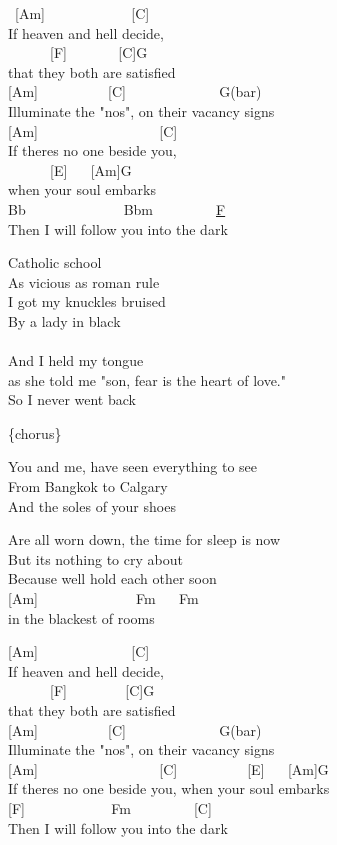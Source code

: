 \documentclass[
  letterpaper,
]{scrbook}
\begin{document}
~{[}Am{]} ~ ~ ~ ~ ~ ~ ~ {[}C{]} ~ ~\\
If heaven and hell decide, ~ ~ ~\\
\hspace*{0.333em} ~ ~ ~ ~{[}F{]} ~ ~ ~ ~ {[}C{]}G\\
that they both are satisfied\\
{[}Am{]} ~ ~ ~ ~ ~ ~{[}C{]} ~ ~ ~ ~ ~ ~ ~ ~G(bar)\\
Illuminate the "no\textquotesingle s", on their vacancy signs\\
{[}Am{]} ~ ~ ~ ~ ~ ~ ~ ~ ~ ~ {[}C{]}\\
If there\textquotesingle s no one beside you,\\
\hspace*{0.333em} ~ ~ ~ ~{[}E{]} ~ ~{[}Am{]}G\\
when your soul embarks\\
Bb ~ ~ ~ ~ ~ ~ ~ ~ Bbm ~ ~ ~ ~ ~ \href{C\%20root\%20note}{F}\\
Then I will follow you into the dark

Catholic school\\
As vicious as roman rule\\
I got my knuckles bruised\\
By a lady in black\\
\hspace*{0.333em} ~\\
And I held my tongue\\
as she told me "son, fear is the heart of love."\\
So I never went back

\{chorus\}

You and me, have seen everything to see\\
From Bangkok to Calgary ~\\
And the soles of your shoes

Are all worn down, the time for sleep is now\\
But it\textquotesingle s nothing to cry about ~\\
Because we\textquotesingle ll hold each other soon\\
{[}Am{]} ~ ~ ~ ~ ~ ~ ~ ~ Fm ~ ~Fm\\
in the blackest of rooms

{[}Am{]} ~ ~ ~ ~ ~ ~ ~ ~{[}C{]} ~ ~\\
If heaven and hell decide,\\
\hspace*{0.333em} ~ ~ ~ ~{[}F{]} ~ ~ ~ ~ ~{[}C{]}G\\
that they both are satisfied\\
{[}Am{]} ~ ~ ~ ~ ~ ~{[}C{]} ~ ~ ~ ~ ~ ~ ~ ~G(bar)\\
Illuminate the "no\textquotesingle s", on their vacancy signs\\
{[}Am{]} ~ ~ ~ ~ ~ ~ ~ ~ ~ ~ {[}C{]} ~ ~ ~ ~ ~ ~{[}E{]} ~ ~{[}Am{]}G\\
If there\textquotesingle s no one beside you, when your soul embarks\\
{[}F{]} ~ ~ ~ ~ ~ ~ ~ Fm ~ ~ ~ ~ ~ {[}C{]} ~\\
Then I will follow you into the dark
\end{document}
